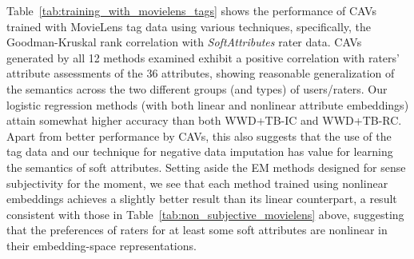 \documentclass[manuscript,screen,nonacm]{acmart}
\newcommand{\1}{{\mathbf 1}}
\theoremstyle{TheoremNum}
\begin{document}
Table~\ref{tab:training_with_movielens_tags} shows the performance of CAVs trained with MovieLens tag data using various techniques, specifically, the Goodman-Kruskal rank correlation with \emph{SoftAttributes} rater data. CAVs generated by all 12 methods examined exhibit a positive correlation with raters' attribute assessments of the 36 attributes, showing reasonable generalization of the semantics across the two different groups (and types) of users/raters. Our logistic regression methods (with both linear and nonlinear attribute embeddings) attain somewhat higher accuracy than both WWD+TB-IC and WWD+TB-RC. Apart from better performance by CAVs, this also suggests that the use of the tag data and our technique for negative data imputation has value for learning the semantics of soft attributes. Setting aside the EM methods designed for sense subjectivity for the moment, we see that each method trained using nonlinear embeddings achieves a slightly better result than its linear counterpart, a result consistent with those in Table~\ref{tab:non_subjective_movielens} above, suggesting that the preferences of raters for at least some soft attributes are nonlinear in their embedding-space representations.  
\end{document}
